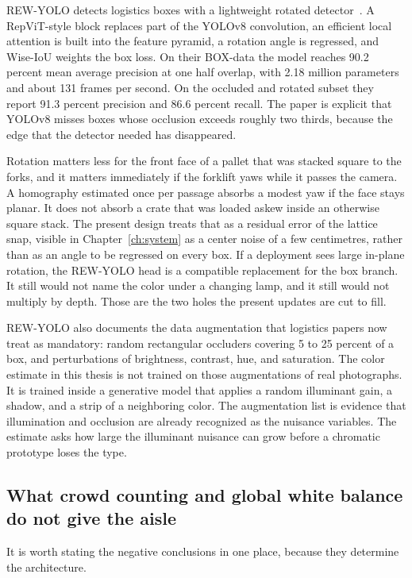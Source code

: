 REW-YOLO detects logistics boxes with a lightweight rotated detector~\cite{wang2025rewyolo}. A RepViT-style block replaces part of the YOLOv8 convolution, an efficient local attention is built into the feature pyramid, a rotation angle is regressed, and Wise-IoU weights the box loss. On their BOX-data the model reaches 90.2 percent mean average precision at one half overlap, with 2.18 million parameters and about 131 frames per second. On the occluded and rotated subset they report 91.3 percent precision and 86.6 percent recall. The paper is explicit that YOLOv8 misses boxes whose occlusion exceeds roughly two thirds, because the edge that the detector needed has disappeared.

Rotation matters less for the front face of a pallet that was stacked square to the forks, and it matters immediately if the forklift yaws while it passes the camera. A homography estimated once per passage absorbs a modest yaw if the face stays planar. It does not absorb a crate that was loaded askew inside an otherwise square stack. The present design treats that as a residual error of the lattice snap, visible in Chapter~\ref{ch:system} as a center noise of a few centimetres, rather than as an angle to be regressed on every box. If a deployment sees large in-plane rotation, the REW-YOLO head is a compatible replacement for the box branch. It still would not name the color under a changing lamp, and it still would not multiply by depth. Those are the two holes the present updates are cut to fill.

REW-YOLO also documents the data augmentation that logistics papers now treat as mandatory: random rectangular occluders covering 5 to 25 percent of a box, and perturbations of brightness, contrast, hue, and saturation. The color estimate in this thesis is not trained on those augmentations of real photographs. It is trained inside a generative model that applies a random illuminant gain, a shadow, and a strip of a neighboring color. The augmentation list is evidence that illumination and occlusion are already recognized as the nuisance variables. The estimate asks how large the illuminant nuisance can grow before a chromatic prototype loses the type.

\subsection{What crowd counting and global white balance do not give the aisle}
\label{sec:negative}

It is worth stating the negative conclusions in one place, because they determine the architecture.

